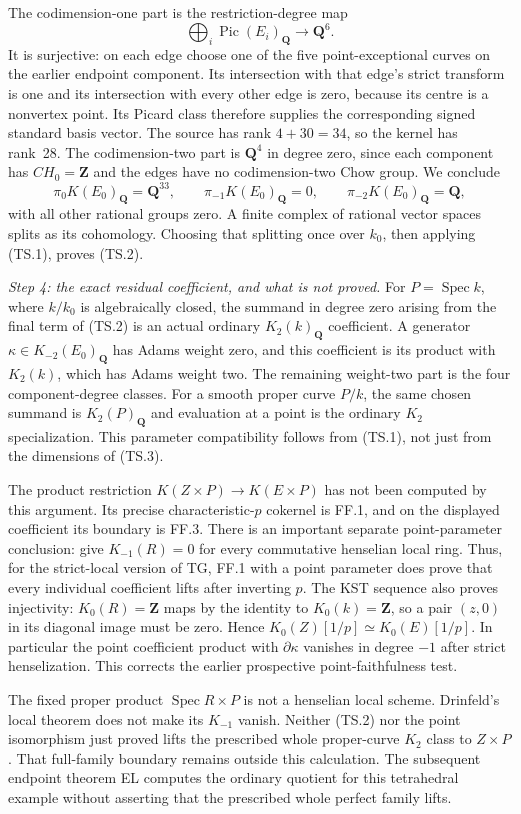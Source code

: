 The codimension-one part is the restriction-degree map
\[
 \bigoplus_i\operatorname{Pic}(E_i)_{\mathbf Q}
       \longrightarrow \mathbf Q^{6}.
\]
It is surjective: on each edge choose one of the five point-exceptional
curves on the earlier endpoint component.  Its intersection with that
edge's strict transform is one and its intersection with every other
edge is zero, because its centre is a nonvertex point.  Its Picard
class therefore supplies the corresponding signed standard basis
vector.  The source has rank $4+30=34$, so the kernel has rank~28.
The codimension-two part is $\mathbf Q^4$ in degree zero, since each
component has $CH_0=\mathbf Z$ and the edges have no codimension-two
Chow group.  We conclude
\[
 \pi_0K(E_0)_{\mathbf Q}=\mathbf Q^{33},\qquad
 \pi_{-1}K(E_0)_{\mathbf Q}=0,\qquad
 \pi_{-2}K(E_0)_{\mathbf Q}=\mathbf Q,
\]
with all other rational groups zero.  A finite complex of rational
vector spaces splits as its cohomology.  Choosing that splitting
once over $k_0$, then applying (TS.1), proves (TS.2).

\emph{Step 4: the exact residual coefficient, and what is not proved.}
For $P=\operatorname{Spec}k$, where $k/k_0$ is algebraically closed,
the summand in degree zero arising from the final term of (TS.2) is
an actual ordinary $K_2(k)_{\mathbf Q}$ coefficient.  A generator
$\kappa\in K_{-2}(E_0)_{\mathbf Q}$ has Adams weight zero, and this
coefficient is its product with $K_2(k)$, which has Adams weight two.
The remaining weight-two part is the four component-degree classes.
For a smooth proper curve $P/k$, the same chosen summand is
$K_2(P)_{\mathbf Q}$ and evaluation at a point is the ordinary
$K_2$ specialization.  This parameter compatibility follows from
(TS.1), not just from the dimensions of (TS.3).

The product restriction $K(Z\times P)\to K(E\times P)$ has not been
computed by this argument.  Its precise characteristic-$p$ cokernel
is FF.1, and on the displayed coefficient its boundary is FF.3.
There is an important separate point-parameter conclusion:
\citet[Theorem~3.7 and Remark~(ii), author p.~8]{frDrinfeld2004Tate}
give $K_{-1}(R)=0$ for every commutative henselian local ring.
Thus, for the strict-local version of TG, FF.1 with a point parameter
does prove that every individual coefficient lifts after inverting
$p$.  The KST sequence also proves injectivity: $K_0(R)=\mathbf Z$
maps by the identity to $K_0(k)=\mathbf Z$, so a pair $(z,0)$ in its
diagonal image must be zero.  Hence $K_0(Z)[1/p]\simeq K_0(E)[1/p]$.
In particular the point coefficient product with $\partial\kappa$
vanishes in degree $-1$ after strict henselization.  This corrects
the earlier prospective point-faithfulness test.

The fixed proper product $\operatorname{Spec}R\times P$ is not a
henselian local scheme.  Drinfeld's local theorem does not make its
$K_{-1}$ vanish.  Neither (TS.2) nor the point isomorphism just proved
lifts the prescribed whole proper-curve $K_2$ class to $Z\times P$.
That full-family boundary remains outside this calculation.
The subsequent endpoint theorem EL computes the ordinary quotient
for this tetrahedral example without asserting that the prescribed
whole perfect family lifts.
